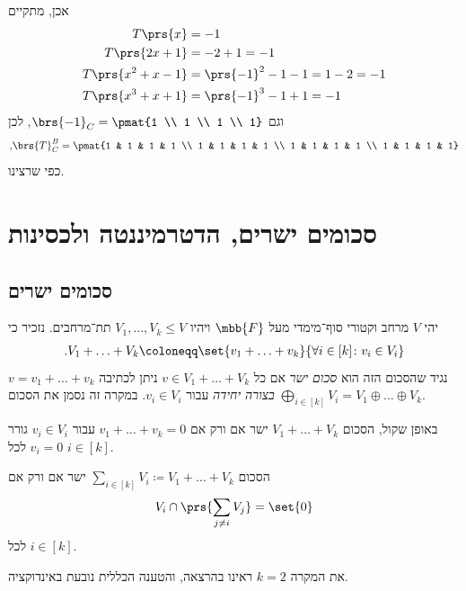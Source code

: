 \documentclass[a4paper,10pt,twoside,openany]{book}
\begin{document}
\begin{solution}
אכן, מתקיים
\begin{align*}
T\prs{x} &= -1 \\
T\prs{2x+1} &= -2 + 1 = -1 \\
T\prs{x^2 + x - 1} &= \prs{-1}^2 -1 - 1 = 1 - 2 = -1 \\
T\prs{x^3 + x + 1} &= \prs{-1}^3 -1 +1 = -1
\end{align*}
וגם
$\brs{-1}_C = \pmat{1 \\ 1 \\ 1 \\ 1}$,
לכן
\[\text{,} \brs{T}^B_C = \pmat{1 & 1 & 1 & 1 \\ 1 & 1 & 1 & 1 \\ 1 & 1 & 1 & 1 \\ 1 & 1 & 1 & 1}\]
כפי שרצינו.
\end{solution}

\chapter{סכומים ישרים, הדטרמיננטה ולכסינות}

\section{סכומים ישרים}

\begin{definition}
יהי
$V$
מרחב וקטורי סוף־מימדי מעל
$\mbb{F}$
ויהיו
$V_1, \ldots, V_k \leq V$
תת־מרחבים.
נזכיר כי
\begin{align*}
\text{.} V_1 + \ldots + V_k \coloneqq \set{v_1 + \ldots + v_k}{\forall i \in [k] \colon v_i \in V_i}
\end{align*}
נגיד שהסכום הזה הוא
\emph{סכום ישר}
אם כל
$v \in V_1 + \ldots + V_k$
ניתן לכתיבה
$v = v_1 + \ldots + v_k$
\emph{בצורה יחידה}
עבור
$v_i \in V_i$.
במקרה זה נסמן את הסכום
$\bigoplus_{i \in [k]} V_i = V_1 \oplus \ldots \oplus V_k$.
\end{definition}

\begin{remark}
באופן שקול, הסכום
$V_1 + \ldots + V_k$
ישר אם ורק אם
$v_1 + \ldots + v_k = 0$
עבור
$v_i \in V_i$
גורר
$v_i = 0$
לכל
$i \in [k]$.
\end{remark}

\begin{proposition}
הסכום
$\sum_{i \in [k]} V_i \coloneqq V_1 + \ldots + V_k$
ישר אם ורק אם
\[V_i \cap \prs{\sum_{j \neq i} V_j} = \set{0}\]
לכל
$i \in [k]$.

את המקרה
$k = 2$
ראינו בהרצאה, והטענה הכללית נובעת באינדוקציה.
\end{proposition}
\end{document}
